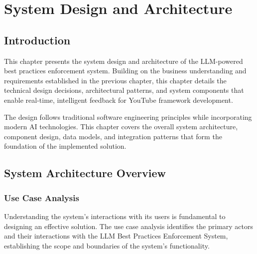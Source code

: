 
\setcounter{chapter}{2}
\chapter{System Design and Architecture}
\minitoc %
\graphicspath{{Chapitre3/figures/}}

\pagestyle{fancy}
\fancyhf{}
\fancyhead[R]{\bfseries\rightmark}
\fancyfoot[R]{\thepage}
\renewcommand{\headrulewidth}{0.5pt}
\renewcommand{\footrulewidth}{0pt}
\renewcommand{\chaptermark}[1]{\markboth{{\chaptername~\thechapter. #1 }}{}}
\renewcommand{\sectionmark}[1]{\markright{\thechapter.\thesection~ #1}}

\begin{spacing}{1.2}

\section*{Introduction}
This chapter presents the system design and architecture of the LLM-powered best practices enforcement system. Building on the business understanding and requirements established in the previous chapter, this chapter details the technical design decisions, architectural patterns, and system components that enable real-time, intelligent feedback for YouTube framework development.

The design follows traditional software engineering principles while incorporating modern AI technologies. This chapter covers the overall system architecture, component design, data models, and integration patterns that form the foundation of the implemented solution.

\section{System Architecture Overview}


\subsection{Use Case Analysis}

Understanding the system's interactions with its users is fundamental to designing an effective solution. The use case analysis identifies the primary actors and their interactions with the LLM Best Practices Enforcement System, establishing the scope and boundaries of the system's functionality.


\end{spacing}
